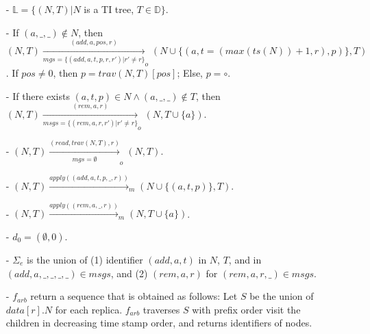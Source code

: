 \begin{itemize}
\setlength{\itemsep}{0.5pt}
\item[-] $\mathbb{L} = \{ (N,T) \vert N$ is a TI tree, $T \in \mathbb{D} \}$.

\item[-] If $(a,\_,\_) \notin N$, then $(N,T) \xrightarrow[\mathit{mgs} = \{ (\mathit{add},a,t,p,r,r') \vert r' \neq r \}]{(\mathit{add},a,\mathit{pos},r)}_o (N \cup \{ (a,t=(\mathit{max}(\mathit{ts}(N))+1,r),p) \}, T)$. If $\mathit{pos} \neq 0$, then $p = \mathit{trav}(N,T)[\mathit{pos}]$; Else, $p = \circ$.

\item[-] If there exists $(a,t,p) \in N \wedge (a,\_,\_) \notin T$, then $(N,T) \xrightarrow[\mathit{msgs} = \{ (\mathit{rem},a,r,r') \vert r' \neq r \} ]{(\mathit{rem},a,r)}_o (N,T \cup \{ a \})$.

\item[-] $(N,T) \xrightarrow[\mathit{mgs} = \emptyset]{(\mathit{read},\mathit{trav}(N,T),r)}_o (N,T)$.

\item[-] $(N,T) \xrightarrow{\mathit{apply}((\mathit{add},a,t,p,\_,r))}_m (N \cup \{ (a,t,p) \},T)$.

\item[-] $(N,T) \xrightarrow{\mathit{apply}((\mathit{rem},a,\_,r))}_m (N,T \cup \{ a \})$.

\item[-] $d_0 = (\emptyset,0)$.

\item[-] $\Sigma_e$ is the union of (1) identifier $(\mathit{add},a,t)$ in $N$, $T$, and in $(\mathit{add},a,\_,\_,\_,\_) \in \mathit{msgs}$, and (2) $(\mathit{rem},a,r)$ for $(\mathit{rem},a,r,\_) \in \mathit{msgs}$.
\item[-] $f_{\mathit{arb}}$ return a sequence that is obtained as follows: Let $S$ be the union of $\mathit{data}[r].N$ for each replica. $f_{\mathit{arb}}$ traverses $S$ with prefix order visit the children in decreasing time stamp order, and returns identifiers of nodes.
\end{itemize}






























